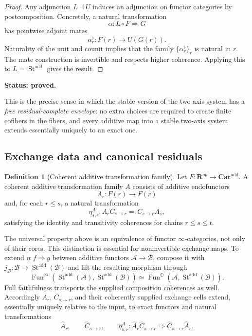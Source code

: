 \documentclass[11pt]{article}
\theoremstyle{definition}
\newtheorem{definition}[theorem]{Definition}
\theoremstyle{remark}
\newcommand{\Rcat}{\mathbf R}
\newcommand{\status}[1]{\textbf{Status: #1.}}
\begin{document}
\begin{proof}
Any adjunction $L\dashv U$ induces an adjunction on functor categories by postcomposition. Concretely, a natural transformation
\[
\alpha:L\circ F\Rightarrow G
\]
has pointwise adjoint mates
\[
\alpha_r^{\flat}:F(r)\longrightarrow U(G(r)).
\]
Naturality of the unit and counit implies that the family $\{\alpha_r^{\flat}\}_r$ is natural in $r$. The mate construction is invertible and respects higher coherence. Applying this to $L=\operatorname{St}^{\mathrm{add}}$ gives the result.
\end{proof}

\status{proved}

This is the precise sense in which the stable version of the two-axis system has a \emph{free residual-complete envelope}: no extra choices are required to create finite cofibers in the fibers, and every additive map into a stable two-axis system extends essentially uniquely to an exact one.

\subsection{Exchange data and canonical residuals}

\begin{definition}[Coherent additive transformation family]
Let $F:\Rcat^{op}\to\mathbf{Cat}^{\mathrm{add}}$. A coherent additive transformation family $A$ consists of additive endofunctors
\[
A_r:F(r)\to F(r)
\]
and, for each $r\le s$, a natural transformation
\[
\eta^A_{s,r}:A_rC_{s\to r}\Longrightarrow C_{s\to r}A_s,
\]
satisfying the identity and transitivity coherences for chains $r\le s\le t$.
\end{definition}

The universal property above is an equivalence of functor $\infty$-categories, not only of their cores. This distinction is essential for noninvertible exchange maps. To extend $\eta:f\Rightarrow g$ between additive functors $\mathcal A\to\mathcal B$, compose it with $j_{\mathcal B}:\mathcal B\to\operatorname{St}^{\mathrm{add}}(\mathcal B)$ and lift the resulting morphism through
\[
\operatorname{Fun}^{\mathrm{ex}}(\operatorname{St}^{\mathrm{add}}(\mathcal A),\operatorname{St}^{\mathrm{add}}(\mathcal B))
\simeq\operatorname{Fun}^{\oplus}(\mathcal A,\operatorname{St}^{\mathrm{add}}(\mathcal B)).
\]
Full faithfulness transports the supplied composition coherences as well. Accordingly $A_r$, $C_{s\to r}$, and their coherently supplied exchange cells extend, essentially uniquely relative to the input, to exact functors and natural transformations
\[
\widehat A_r,
\qquad
\widehat C_{s\to r},
\qquad
\widehat\eta^A_{s,r}:
\widehat A_r\widehat C_{s\to r}
\Longrightarrow
\widehat C_{s\to r}\widehat A_s.
\]
\end{document}
